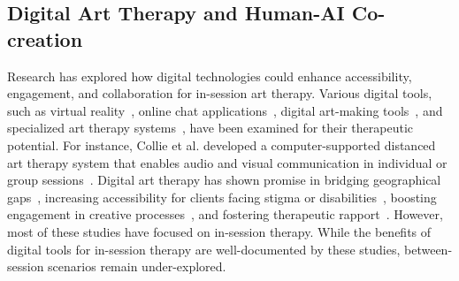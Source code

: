 %


\subsection{Digital Art Therapy and Human-AI Co-creation}
Research has explored how digital technologies could enhance accessibility, engagement, and collaboration for in-session art therapy. Various digital tools, such as virtual reality~\cite{kaimal2020virtual}, online chat applications~\cite{collie2006distance, hankinson2022keeping}, digital art-making tools~\cite{darewych2015digital, choe2014exploration}, and specialized art therapy systems~\cite{cubranic1998computer,yilma2024artful}, have been examined for their therapeutic potential. 
For instance, Collie et al. developed a computer-supported distanced art therapy system that enables audio and visual communication in individual or group sessions~\cite{collie2002computer}. 
Digital art therapy has shown promise in bridging geographical gaps~\cite{levy2018telehealth, collie2017online}, increasing accessibility for clients facing stigma or disabilities~\cite{kim2023case}, boosting engagement in creative processes~\cite{levy2018telehealth}, and fostering therapeutic rapport~\cite{collie2002computer, orr2012technology}. 
However, most of these studies have focused on in-session therapy. While the benefits of digital tools for in-session therapy are well-documented by these studies, between-session scenarios remain under-explored. 

